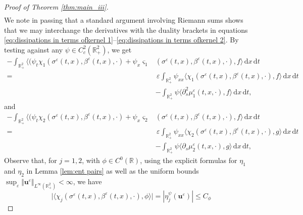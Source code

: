 \documentclass[11pt,a4paper,reqno]{amsart}
\numberwithin{equation}{section}
\theoremstyle{definition}
\theoremstyle{remark}
\newcommand{\bu}{\mathbf{u}}
\renewcommand{\d}{\, \mathrm{d}}
\renewcommand{\leq}{\leqslant}
\begin{document}
{\begin{proof}[Proof of Theorem \ref{thm:main_iii}]
\begin{equation}
\begin{aligned}
        \end{aligned}
    \end{equation}
    We note in passing that a standard argument involving Riemann sums shows that we may interchange the derivatives with the duality brackets in equations \eqref{eq:dissipations in terms ofkernel 1}--\eqref{eq:dissipations in terms ofkernel 2}. By testing against any $\psi \in C^2_c(\mathbb{R}^2_+)$, we get 
    \begin{equation}\label{eq:before limit kinetic 1}
    \begin{aligned}
        -\int_{\mathbb{R}^2_+} \Big\langle \Big( \psi_t \chi_1(\sigma^\varepsilon(t,x),\beta^\varepsilon(t,x),\cdot) + \psi_x \varsigma_1&(\sigma^\varepsilon(t,x),\beta^\varepsilon(t,x),\cdot) , f \Big\rangle \d x \d t \\ 
        =& \, \varepsilon \int_{\mathbb{R}^2_+} \psi_{xx}\langle \chi_1(\sigma^\varepsilon(t,x),\beta^\varepsilon(t,x),\cdot) , f \rangle \d x \d t \\ 
        &- \int_{\mathbb{R}^2_+} \psi \langle \partial^2_s\mu_1^\varepsilon(t,x,\cdot), f \rangle \d x \d t, 
        \end{aligned}
    \end{equation}
    and 
        \begin{equation}\label{eq:before limit kinetic 2}
    \begin{aligned}
        -\int_{\mathbb{R}^2_+} \Big\langle \Big( \psi_t \chi_2(\sigma^\varepsilon(t,x),\beta^\varepsilon(t,x),\cdot) + \psi_x \varsigma_2&(\sigma^\varepsilon(t,x),\beta^\varepsilon(t,x),\cdot) , f \Big\rangle \d x \d t \\ 
        =& \, \varepsilon \int_{\mathbb{R}^2_+} \psi_{xx} \langle \chi_2(\sigma^\varepsilon(t,x),\beta^\varepsilon(t,x),\cdot) , g \rangle \d x \d t \\ 
        &- \int_{\mathbb{R}^2_+} \psi \langle \partial_s\mu_2^\varepsilon(t,x,\cdot), g \rangle \d x \d t, 
        \end{aligned}
    \end{equation}
    Observe that, for $j=1,2$, with $\phi \in C^0(\mathbb{R})$, using the explicit formulas for $\eta_1$ and $\eta_2$ in Lemma \ref{lem:ent pairs} as well as the uniform bounds $\sup_\varepsilon \Vert \bu^\varepsilon \Vert_{L^\infty(\mathbb{R}^2_+)} < \infty$, we have 
    \begin{equation*}
        \big| \langle \chi_j(\sigma^\varepsilon(t,x),\beta^\varepsilon(t,x),\cdot) , \phi \rangle \big| = |\eta_j^\psi(\bu^\varepsilon)| \leq C_\phi 

\end{equation*}
\end{proof}}
\end{document}
